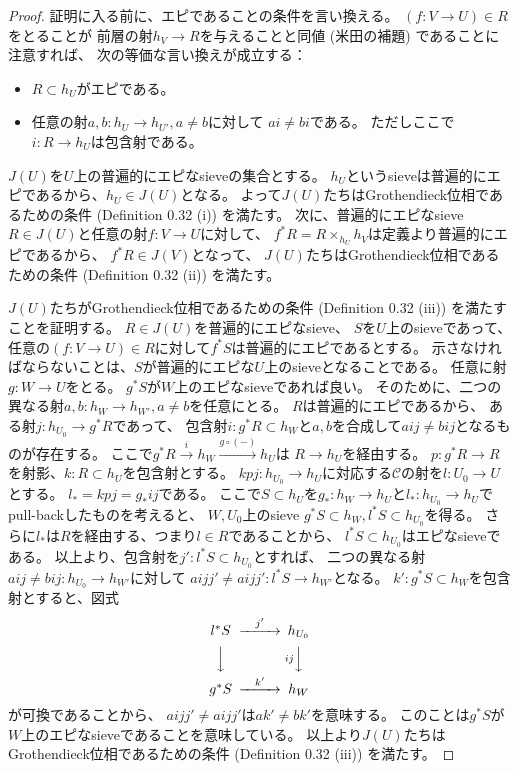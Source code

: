\documentclass[uplatex]{jsarticle}
\theoremstyle{definition}
\def\mcC{\mathcal{C}}
\begin{document}
\begin{proof}
  証明に入る前に、エピであることの条件を言い換える。
  \((f:V\to U)\in R\)をとることが
  前層の射\(h_V\to R\)を与えることと同値 (米田の補題) であることに注意すれば、
  次の等価な言い換えが成立する：
  \begin{itemize}
    \item[ \ ]
    \(R\subset h_U\)がエピである。
    \item[\(\Leftrightarrow\)]
    任意の射\(a,b:h_U\to h_{U'} , a\neq b\)に対して
    \(ai \neq bi\)である。
    ただしここで\(i:R\to h_U\)は包含射である。
  \end{itemize}

  \(J(U)\)を\(U\)上の普遍的にエピなsieveの集合とする。
  \(h_U\)というsieveは普遍的にエピであるから、\(h_U\in J(U)\)となる。
  よって\(J(U)\)たちはGrothendieck位相であるための条件 (Definition 0.32 (i)) を満たす。
  次に、普遍的にエピなsieve \(R\in J(U)\)と任意の射\(f:V\to U\)に対して、
  \(f^*R = R\times_{h_U}h_V\)は定義より普遍的にエピであるから、
  \(f^*R\in J(V)\)となって、
  \(J(U)\)たちはGrothendieck位相であるための条件 (Definition 0.32 (ii)) を満たす。

  \(J(U)\)たちがGrothendieck位相であるための条件 (Definition 0.32 (iii)) を満たすことを証明する。
  \(R\in J(U)\)を普遍的にエピなsieve、
  \(S\)を\(U\)上のsieveであって、
  任意の\((f:V\to U)\in R\)に対して\(f^*S\)は普遍的にエピであるとする。
  示さなければならないことは、\(S\)が普遍的にエピな\(U\)上のsieveとなることである。
  任意に射\(g:W\to U\)をとる。
  \(g^*S\)が\(W\)上のエピなsieveであれば良い。
  そのために、二つの異なる射\(a,b:h_W\to h_{W'}, a\neq b\)を任意にとる。
  \(R\)は普遍的にエピであるから、
  ある射\(j:h_{U_0}\to g^*R\)であって、
  包含射\(i:g^*R\subset h_W\)と\(a,b\)を合成して\(aij\neq bij\)となるものが存在する。
  ここで\(g^*R\xrightarrow{i} h_W \xrightarrow{g\circ (-)} h_U\)は
  \(R\to h_U\)を経由する。
  \(p:g^*R\to R\)を射影、\(k:R\subset h_U\)を包含射とする。
  \(kpj:h_{U_0}\to h_U\)に対応する\(\mcC\)の射を\(l:U_0\to U\)とする。
  \(l_* = kpj = g_*ij\)である。
  ここで\(S\subset h_U\)を\(g_*:h_W\to h_U\)と\(l_*:h_{U_0}\to h_U\)でpull-backしたものを考えると、
  \(W,U_0\)上のsieve \(g^*S\subset h_W,l^*S\subset h_{U_0}\)を得る。
  さらに\(l_*\)は\(R\)を経由する、つまり\(l\in R\)であることから、
  \(l^*S\subset h_{U_0}\)はエピなsieveである。
  以上より、包含射を\(j':l^*S\subset h_{U_0}\)とすれば、
  二つの異なる射\(aij\neq bij : h_{U_0}\to h_{W'}\)に対して
  \(aijj'\neq aijj' : l^*S\to h_{W'}\)となる。
  \(k':g^*S\subset h_W\)を包含射とすると、図式
  \[
  \begin{CD}
    l^* S @>j'>> h_{U_0} \\
    @VVV @V ij VV \\
    g^*S @> k' >> h_W
  \end{CD}
  \]
  が可換であることから、
  \(aijj'\neq aijj'\)は\(ak'\neq bk'\)を意味する。
  このことは\(g^*S\)が\(W\)上のエピなsieveであることを意味している。
  以上より\(J(U)\)たちはGrothendieck位相であるための条件 (Definition 0.32 (iii)) を満たす。



\end{proof}
\end{document}
